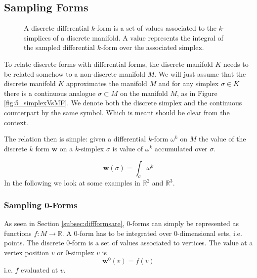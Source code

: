 \subsection{Sampling Forms}
\label{subsec:samplingForms}

\begin{figure}%
\begin{center}
\def\svgwidth{0.8\columnwidth}

\end{center}
\caption{A discrete differential $k$-form is a set of values associated to the $k$-simplices of a discrete manifold. A value represents the integral of the sampled differential $k$-form over the associated simplex.}%
\label{fig:5_discreteForms}%
\end{figure}

To relate discrete forms with differential forms, the discrete manifold $K$ needs to be related somehow to a non-discrete manifold $M$. We will just assume that the discrete manifold $K$ approximates the manifold $M$ and for any simplex $\sigma \in K$ there is a continuous analogue $\sigma \subset M$ on the manifold $M$, as in Figure \ref{fig:5_simplexVsMF}. We denote both the discrete simplex and the continuous counterpart by the same symbol. Which is meant should be clear from the context.

The relation then is simple: given a differential $k$-form $\omega^k$ on $M$ the value of the discrete $k$ form $\textbf{w}$ on a $k$-simplex $\sigma$ is value of $\omega^k$ accumulated over $\sigma$.

 \[\textbf{w}(\sigma) = \int_\sigma \omega^k\]
In the following we look at some examples in $\mathbb R^2$ and $\mathbb R^3$.

\subsubsection{Sampling 0-Forms}
As seen in Section \ref{subsec:diffformsare}, $0$-forms can simply be represented as functions $f: M\to \mathbb R$. A $0$-form has to be integrated over 0-dimensional sets, i.e. points. The discrete 0-form is a set of values associated to vertices. The value at a vertex position $v$ or 0-simplex $v$
 is
\[\textbf{w}^0(v) = f(v)\]
i.e. $f$ evaluated at $v$.

